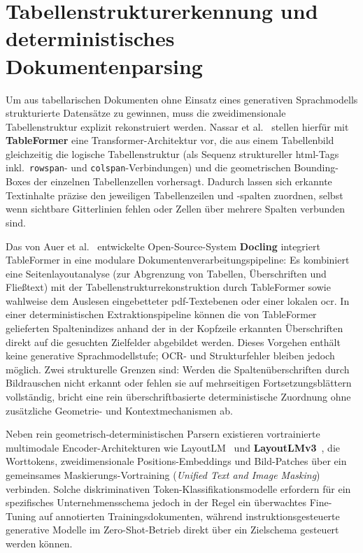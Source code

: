 \section{Tabellenstrukturerkennung und deterministisches Dokumentenparsing}
\label{sec:tabellenstruktur}

Um aus tabellarischen Dokumenten ohne Einsatz eines generativen Sprachmodells strukturierte Datensätze zu gewinnen, muss die zweidimensionale Tabellenstruktur explizit rekonstruiert werden. Nassar et al.~\cite{Nassar2022TableFormer} stellen hierfür mit \textbf{TableFormer} eine Transformer-Architektur vor, die aus einem Tabellenbild gleichzeitig die logische Tabellenstruktur (als Sequenz struktureller \ac{html}-Tags inkl.\ \texttt{rowspan}- und \texttt{colspan}-Verbindungen) und die geometrischen Bounding-Boxes der einzelnen Tabellenzellen vorhersagt. Dadurch lassen sich erkannte Textinhalte präzise den jeweiligen Tabellenzeilen und -spalten zuordnen, selbst wenn sichtbare Gitterlinien fehlen oder Zellen über mehrere Spalten verbunden sind.

Das von Auer et al.~\cite{Auer2024DoclingSelection} entwickelte Open-Source-System \textbf{Docling} integriert TableFormer in eine modulare Dokumentenverarbeitungspipeline: Es kombiniert eine Seitenlayoutanalyse (zur Abgrenzung von Tabellen, Überschriften und Fließtext) mit der Tabellenstrukturrekonstruktion durch TableFormer sowie wahlweise dem Auslesen eingebetteter \ac{pdf}-Textebenen oder einer lokalen \ac{ocr}. In einer deterministischen Extraktionspipeline können die von TableFormer gelieferten Spaltenindizes anhand der in der Kopfzeile erkannten Überschriften direkt auf die gesuchten Zielfelder abgebildet werden. Dieses Vorgehen enth\"alt keine generative Sprachmodellstufe; OCR- und Strukturfehler bleiben jedoch m\"oglich. Zwei strukturelle Grenzen sind: Werden die Spaltenüberschriften durch Bildrauschen nicht erkannt oder fehlen sie auf mehrseitigen Fortsetzungsblättern vollständig, bricht eine rein überschriftbasierte deterministische Zuordnung ohne zusätzliche Geometrie- und Kontextmechanismen ab.

Neben rein geometrisch-deterministischen Parsern existieren vortrainierte multimodale Encoder-Architekturen wie LayoutLM~\cite{Xu2020LayoutLM} und \textbf{LayoutLMv3}~\cite{Huang2022LayoutLMv3}, die Worttokens, zweidimensionale Positions-Embeddings und Bild-Patches über ein gemeinsames Maskierungs-Vortraining (\emph{Unified Text and Image Masking}) verbinden. Solche diskriminativen Token-Klassifikationsmodelle erfordern für ein spezifisches Unternehmensschema jedoch in der Regel ein überwachtes Fine-Tuning auf annotierten Trainingsdokumenten, während instruktionsgesteuerte generative Modelle im Zero-Shot-Betrieb direkt über ein Zielschema gesteuert werden können.

